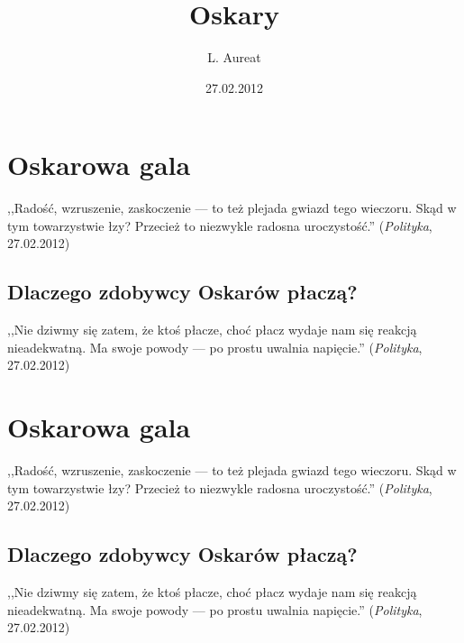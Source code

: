 \documentclass[a4paper,12pt]{article}
\title{Oskary}
\author{L. Aureat}
\date{27.02.2012}
\begin{document}
\maketitle
\tableofcontents

\newpage

\section{Oskarowa gala}

,,Radość, wzruszenie, zaskoczenie --- to też plejada gwiazd tego
wieczoru. Skąd w tym towarzystwie łzy? Przecież to niezwykle radosna
uroczystość.'' (\emph{Polityka}, 27.02.2012)

\subsection{Dlaczego zdobywcy Oskarów płaczą?}

,,Nie dziwmy się zatem, że ktoś płacze, choć płacz wydaje nam się
reakcją nieadekwatną. Ma swoje powody --- po prostu uwalnia napięcie.''
(\emph{Polityka}, 27.02.2012)

\newpage

\section{Oskarowa gala}

,,Radość, wzruszenie, zaskoczenie --- to też plejada gwiazd tego
wieczoru. Skąd w tym towarzystwie łzy? Przecież to niezwykle radosna
uroczystość.'' (\emph{Polityka}, 27.02.2012)

\subsection{Dlaczego zdobywcy Oskarów płaczą?}

,,Nie dziwmy się zatem, że ktoś płacze, choć płacz wydaje nam się
reakcją nieadekwatną. Ma swoje powody --- po prostu uwalnia napięcie.''
(\emph{Polityka}, 27.02.2012)
\end{document}
